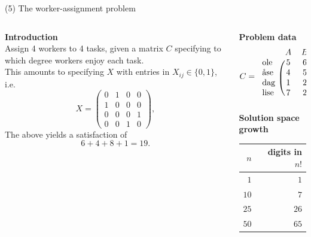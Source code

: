 \documentclass[11pt, aspectratio=149]{beamer}
\theoremstyle{plain}
\begin{document}
\begin{frame}[fragile, t]{(5) The worker-assignment problem}
	\begin{columns}
		\begin{column}{0.6\textwidth}
			\textbf{Introduction}\\ \vspace*{0.5em} 
			Assign 4 workers to 4 tasks, given a matrix $C$ specifying to which degree workers enjoy each task.
			\\
			\vspace*{0.5em} 
			This amounts to specifying
			$X$ with entries in $X_{ij} \in \{0, 1\}$, i.e.
			\begin{equation*}
				X = \begin{pmatrix}
				0 & 1 & 0 & 0\\ 
				1 & 0 & 0 & 0\\ 
				0 & 0 & 0 & 1 \\ 
				0 & 0 & 1 & 0
				\end{pmatrix},
			\end{equation*}
			The above yields a satisfaction of
			\begin{equation*}
				6 + 4 + 8 + 1 = 19.
			\end{equation*}
			
			
		\end{column}
		\begin{column}{0.4\textwidth}%
			\textbf{Problem data}
			\[
			C = 
			\begin{blockarray}{rcccc}
			& A & B & C & D  \\
			\begin{block}{l	(cccc)}
			\text{ole}  & 5 &  6 & 1 &  6 \\
			\text{åse}  & 4 &  5 & 0 &  1 \\
			\text{dag}  & 1 &  2 & 6 &  8 \\
			\text{lise} & 7 &  2 & 1 &  1 \\
			\end{block}
			\end{blockarray}
			\]
			\textbf{Solution space growth}
			\begin{tabular}{rr}
				\toprule 
				$n$ & digits in $n!$  \\ \midrule
				$1$ & $1$ \\
				$10$ & $7$   \\
				$25$ & $26$   \\
				$50$ & $65$ \\ \bottomrule
			\end{tabular}
		\end{column}
	\end{columns}
\end{frame}
\end{document}
